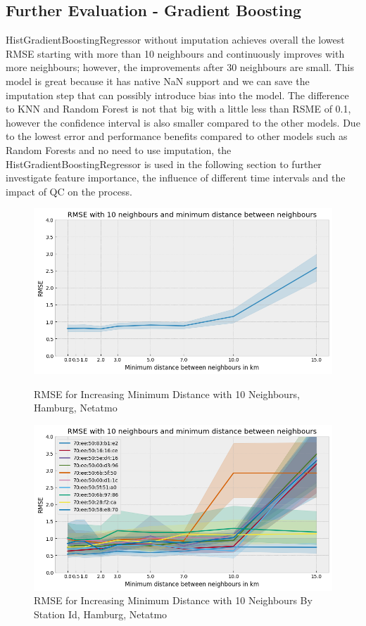 \subsection{Further Evaluation - Gradient Boosting}

HistGradientBoostingRegressor without imputation achieves overall the lowest RMSE starting with more than 10 neighbours and continuously improves with more neighbours; however, the improvements after 30 neighbours are small. This model is great because it has native NaN support and we can save the imputation step that can possibly introduce bias into the model. The difference to KNN and Random Forest is not that big with a little less than RSME of 0.1, however the confidence interval is also smaller compared to the other models. Due to the lowest error and performance benefits compared to other models such as Random Forests and no need to use imputation, the HistGradientBoostingRegressor is used in the following section to further investigate feature importance, the influence of different time intervals and the impact of QC on the process.\\

\begin{figure}[htp]
    \centering
    \includegraphics[width=1\textwidth]{images/rmse_10_neighbours_min_distance.png}
    \caption{RMSE for Increasing Minimum Distance with 10 Neighbours, Hamburg, Netatmo}
    \label{fig:eval hamburg minimum distance between stations}

    \centering
    \includegraphics[width=1\textwidth]{images/rmse_10_neighbours_min_distance_by_pid.png}
    \caption{RMSE for Increasing Minimum Distance with 10 Neighbours By Station Id, Hamburg, Netatmo}
    \label{fig:eval hamburg minimum distance between stations by station id}
\end{figure}

